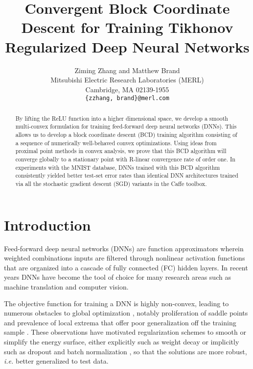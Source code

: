 \documentclass{article}
\title{Convergent Block Coordinate Descent for Training Tikhonov Regularized Deep Neural Networks}
\author{
	Ziming Zhang and Matthew Brand \\
	Mitsubishi Electric Research Laboratories (MERL) \\	
	Cambridge, MA 02139-1955 \\
	\texttt{\{zzhang, brand\}@merl.com} \\
}
\def\ie{\emph{i.e. }}
\begin{document}
	
\maketitle
	
\begin{abstract}
By lifting the ReLU function into a higher dimensional space, we develop a smooth multi-convex formulation for training feed-forward deep neural networks (DNNs). This allows us to develop a block coordinate descent (BCD) training algorithm consisting of a sequence of numerically well-behaved convex optimizations. Using ideas from proximal point methods in convex analysis, we prove that this BCD algorithm will converge globally to a stationary point with R-linear convergence rate of order one. In experiments with the MNIST database, DNNs trained with this BCD algorithm consistently yielded better test-set error rates than identical DNN architectures trained via all the stochastic gradient descent (SGD) variants in the Caffe toolbox.
\end{abstract}
	
\section{Introduction}
Feed-forward deep neural networks (DNNs) are function approximators wherein weighted combinations inputs are filtered through nonlinear activation functions that are organized into a cascade of fully connected (FC) hidden layers.  In recent years DNNs have become the tool of choice for many research areas such as machine translation and computer vision.%
	
The objective function for training a DNN is highly non-convex, leading to numerous obstacles to global optimization \cite{choromanska2015loss}, notably proliferation of saddle points \cite{dauphin2014identifying} and prevalence of local extrema that offer poor generalization off the training sample \cite{chaudhari2016entropy}.  These observations have motivated regularization schemes to smooth or simplify the energy surface, either explicitly such as weight decay \cite{krogh1991simple} or implicitly such as dropout \cite{srivastava2014dropout} and batch normalization \cite{ioffe2015batch}, so that the solutions are more robust, \ie better generalized to test data.
\end{document}
